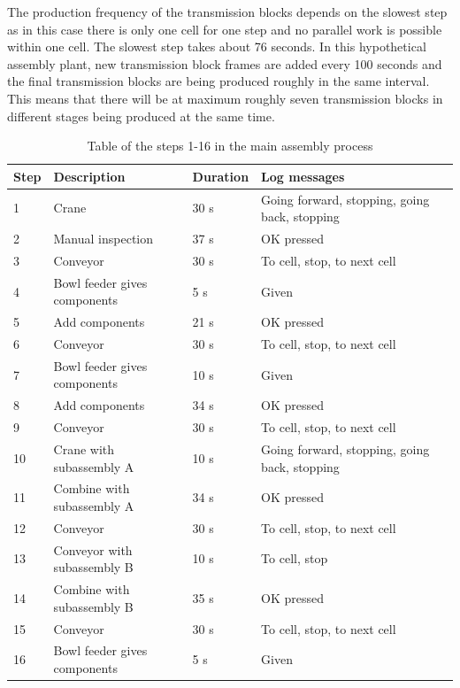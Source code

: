 \documentclass[journal]{IEEEtran}
\begin{document}
The production frequency of the transmission blocks depends on the slowest step as in this case there is only one cell for one step and no
parallel work is possible within one cell. The slowest step takes about 76 seconds. In this hypothetical assembly plant, new transmission block
frames are added every 100 seconds and the final transmission blocks are being produced roughly in the same interval. This means that there
will be at maximum roughly seven transmission blocks in different stages being produced at the same time.

\begin{table}[!t]
\renewcommand{\arraystretch}{1.3}
\caption{Table of the steps 1-16 in the main assembly process}
\label{mainsteps1}
\centering
\begin{tabular}{|p{5mm}|p{20mm}|p{10mm}|p{15mm}|p{15mm}|}
\hline
Step & Description & Duration & Log messages \\
\hline
\hline
1 & Crane & 30 s & Going forward, stopping, going back, stopping \\
\hline
2 & Manual inspection & 37 s & OK pressed \\
\hline
3 & Conveyor & 30 s & To cell, stop, to next cell \\
\hline
4 & Bowl feeder gives components & 5 s & Given \\
\hline
5 & Add components & 21 s & OK pressed \\
\hline
6 & Conveyor & 30 s & To cell, stop, to next cell \\
\hline
7 & Bowl feeder gives components & 10 s & Given \\
\hline
8 & Add components & 34 s & OK pressed \\
\hline
9 & Conveyor & 30 s & To cell, stop, to next cell \\
\hline
10 & Crane with subassembly A & 10 s & Going forward, stopping, going back, stopping \\
\hline
11 & Combine with subassembly A & 34 s & OK pressed \\
\hline
12 & Conveyor & 30 s & To cell, stop, to next cell \\
\hline
13 & Conveyor with subassembly B & 10 s & To cell, stop \\
\hline
14 & Combine with subassembly B & 35 s & OK pressed \\
\hline
15 & Conveyor & 30 s & To cell, stop, to next cell \\
\hline
16 & Bowl feeder gives components & 5 s & Given \\
\hline
\end{tabular}
\end{table}
\end{document}
